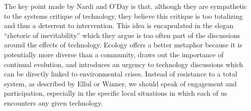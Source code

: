 The key point made by Nardi and O'Day is that, although they are sympathetic to the systems critique of technology, they believe this critique is too totalizing and thus a deterrent to intervention. This idea is encapsulated in the slogan ``rhetoric of inevitability'' which they argue is too often part of the discussions around the effects of technology. Ecology offers a better metaphor because it is potentially more diverse than a community, draws out the importance of continual evolution, and introduces an urgency to technology discussions which can be directly linked to environmental crises. Instead of resistance to a total system, as described by Ellul or Winner, we should speak of engagement and participation, especially in the specific local situations in which each of us encounters any given technology.